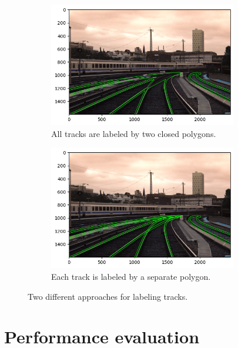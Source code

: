 \documentclass[Master,MDS,english]{BASE/twbook} %
\begin{document}
\begin{figure}[H]
\centering
\begin{subfigure}[t]{.5\textwidth}
  \centering
  \includegraphics[width=0.9\textwidth]{images/labeling/label_union}
  \caption{All tracks are labeled by two closed polygons.}
\end{subfigure}%
\begin{subfigure}[t]{.5\textwidth}
  \centering
  \includegraphics[width=0.9\textwidth]{images/labeling/label_single}
  \caption{Each track is labeled by a separate polygon.}
\end{subfigure}
\caption{Two different approaches for labeling tracks.}
\label{fig:labeling2}
\end{figure}



\section{Performance evaluation}
\end{document}
